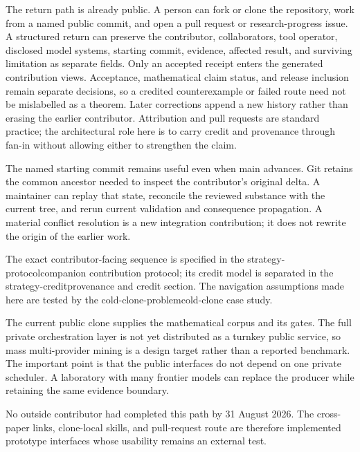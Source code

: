 \documentclass[10pt]{article}
\begin{document}
The return path is already public. A person can fork or clone the repository,
work from a named public commit, and open a pull request or research-progress
issue. A structured return can preserve the contributor, collaborators, tool
operator, disclosed model systems, starting commit, evidence, affected result,
and surviving limitation as separate fields. Only an accepted receipt enters
the generated contribution views. Acceptance, mathematical claim status, and
release inclusion remain separate decisions, so a credited counterexample or
failed route need not be mislabelled as a theorem. Later corrections append a
new history rather than erasing the earlier contributor. Attribution and pull
requests are standard practice; the architectural role here is to carry credit
and provenance through fan-in without allowing either to strengthen the claim.

The named starting commit remains useful even when main advances. Git retains
the common ancestor needed to inspect the contributor's original delta. A
maintainer can replay that state, reconcile the reviewed substance with the
current tree, and rerun current validation and consequence propagation. A
material conflict resolution is a new integration contribution; it does not
rewrite the origin of the earlier work.

The exact contributor-facing sequence is specified in the
%
{strategy-protocol}{companion contribution protocol}; its credit model is
separated in the
%
{strategy-credit}{provenance and credit section}. The navigation assumptions
made here are tested by the
%
{cold-clone-problem}{cold-clone case study}.

The current public clone supplies the mathematical corpus and its gates. The
full private orchestration layer is not yet distributed as a turnkey public
service, so mass multi-provider mining is a design target rather than a
reported benchmark. The important point is that the public interfaces do not
depend on one private scheduler. A laboratory with many frontier models can
replace the producer while retaining the same evidence boundary.

No outside contributor had completed this path by 31 August 2026. The
cross-paper links, clone-local skills, and pull-request route are therefore
implemented prototype interfaces whose usability remains an external test.
\end{document}
